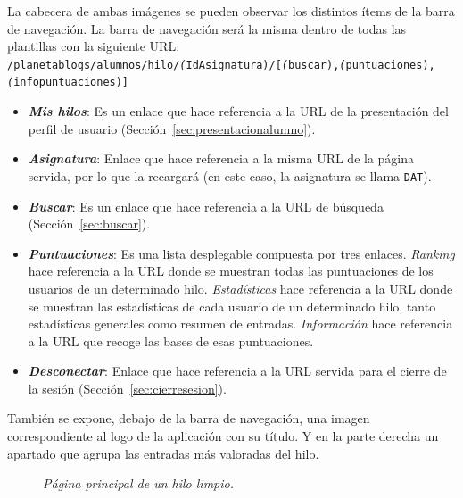 \documentclass[a4paper, 12pt]{book}
\begin{document}
La cabecera de ambas im\'agenes se pueden observar los distintos \'items de la barra de navegaci\'on. La barra de navegaci\'on ser\'a la misma dentro de
todas las plantillas con la siguiente URL: {\scriptsize \texttt{/planetablogs/alumnos/hilo/\textit(IdAsignatura)/[\textit(buscar),\textit(puntuaciones),
\textit(infopuntuaciones)]}}
\begin{itemize}
  \item {\bfseries \textit{Mis hilos}}: Es un enlace que hace referencia a la URL de la presentaci\'on del perfil de usuario 
  (Secci\'on~\ref{sec:presentacionalumno}).
  \item {\bfseries \textit{Asignatura}}: Enlace que hace referencia a la misma URL de la p\'agina servida, por lo que la recargar\'a (en este caso, 
  la asignatura se llama \texttt{DAT}).
  \item {\bfseries \textit{Buscar}}: Es un enlace que hace referencia a la URL de b\'usqueda (Secci\'on~\ref{sec:buscar}).
  \item {\bfseries \textit{Puntuaciones}}: Es una lista desplegable compuesta por tres enlaces. \textit{Ranking} hace referencia a la URL donde se muestran 
  todas las puntuaciones de los usuarios de un determinado hilo. \textit{Estad\'isticas} hace referencia a la URL donde se muestran las estad\'isticas de 
  cada usuario de un determinado hilo, tanto estad\'isticas generales como resumen de entradas. \textit{Informaci\'on} hace referencia a la URL que 
  recoge las bases de esas puntuaciones.
  \item {\bfseries \textit{Desconectar}}: Enlace que hace referencia a la URL servida para el cierre de la sesi\'on (Secci\'on~\ref{sec:cierresesion}).
\end{itemize}
Tambi\'en se expone, debajo de la barra de navegaci\'on, una imagen correspondiente al logo de la aplicaci\'on con su t\'itulo. Y en la parte derecha un 
apartado que agrupa las entradas m\'as valoradas del hilo.

\begin{figure}
  \centering
  \caption{\textit{P\'agina principal de un hilo limpio.}}
  \label{fig:hilos}
\end{figure}
\end{document}
